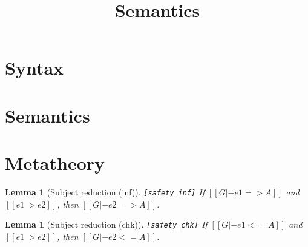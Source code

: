 \documentclass[oneside,a4paper]{article}
\title{\bf Semantics}
\author{}
\date{}
\newtheorem{lemma}[theorem]{Lemma}
\numberwithin{equation}{section}
\begin{document}
\maketitle

\section{Syntax}
\begin{small}
\begin{spacing}{0.4}
\gram{
  \otte\ottinterrule
  \ottv\ottinterrule
}
\end{spacing}
\end{small}

\section{Semantics}
\begin{spacing}{0.4}
\begin{small}
\noindent
\ottdefntypednf{}\ottinterrule
\ottdefnreduction{}\ottinterrule
\end{small}
\end{spacing}


\newpage
\section{Metatheory}

\begin{lemma}[Subject reduction (inf)]\verb|[safety_inf]|
  If $[[G |- e1 => A]]$ 
  and $[[e1 ~> e2]]$, then 
  $[[G |- e2 => A]]$.
\end{lemma}

\begin{lemma}[Subject reduction (chk)]\verb|[safety_chk]|
  If $[[G |- e1 <= A]]$ 
  and $[[e1 ~> e2]]$, then 
  $[[G |- e2 <= A]]$.
\end{lemma}
\end{document}
